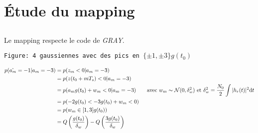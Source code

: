 \documentclass{article}
\begin{document}
\section{Étude du mapping}


\subsection{}

Le mapping respecte le code de \emph{GRAY}.

\texttt{Figure: 4 gaussiennes avec des pics en $\{\pm 1, \pm 3\} g(t_0)$}

\begin{align*}
    p(\hat{a_m} = -1 | a_m = -3) &= p(z_m < 0 | a_m = -3)  \\
    &= p(z(t_0 + mT_s) < 0 | a_m = -3) \\
    &= p(a_m g(t_0) + w_m < 0 | a_m = -3) \quad&\text{avec $w_m \sim \mathcal{N}(0, \delta_w^2)$ et $\delta_w^2 = \frac{N_0}{2} \int |h_r(t)|^2 \mathrm{d}t$} \\
    &= p(-2g(t_0) < -3g(t_0) + w_m < 0)  \\
    &= p(w_m \in [1, 3]g(t_0)) \\
    &= Q\left( \frac{g(t_0)}{\delta_w} \right) - Q\left( \frac{3g(t_0)}{\delta_w} \right)  \\
\end{align*}
\end{document}
